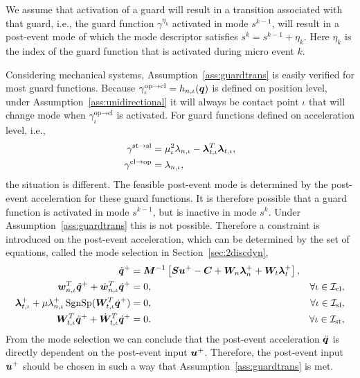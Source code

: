 \documentclass[../DC2017114Bouma.tex]{subfiles}
\begin{document}
\begin{sloppypar}
\begin{myass}\label{ass:guardtrans}
We assume that activation of a guard will result in a transition associated with that guard, i.e., the guard function $\gamma^{\eta_k}$ activated in mode $s^{k-1}$, will result in a post-event mode of which the mode descriptor satisfies $s^{k} = s^{k-1} + \eta_k$. Here $\eta_k$ is the index of the guard function that is activated during micro event $k$.
\end{myass}
\end{sloppypar}

\begin{sloppypar}
\begin{myremark}
Considering mechanical systems, Assumption~\ref{ass:guardtrans} is easily verified for most guard functions. Because $\gamma^{\text{op}\rightarrow\text{cl}}_{\iota} = h_{n,\iota}({\boldsymbol{q}})$ is defined on position level, under Assumption~\ref{ass:unidirectional} it will always be contact point $\iota$ that will change mode when $\gamma^{\text{op}\rightarrow\text{cl}}_{\iota}$ is activated. For guard functions defined on acceleration level, i.e.,
\begin{align*}
\gamma^{\textnormal{st}\rightarrow\textnormal{sl}} &= \mu_\iota^2\lambda_{n,\iota} - \boldsymbol{\lambda}^T_{t,\iota}\boldsymbol{\lambda}_{t,\iota},\\
\gamma^{\textnormal{cl}\rightarrow\textnormal{op}} &= \lambda_{n,\iota},
\end{align*}
the situation is different. The feasible post-event mode is determined by the post-event acceleration for these guard functions. It is therefore possible that a guard function is activated in mode $s^{k-1}$, but is inactive in mode $s^{k}$. Under Assumption~\ref{ass:guardtrans} this is not possible. Therefore a constraint is introduced on the post-event acceleration, which can be determined by the set of equations, called the mode selection in Section~\ref{sec:2discdyn},
\begin{align}
\ddot{{\boldsymbol{q}}}^+ &= {\boldsymbol{M}}^{-1}\left[{\boldsymbol{S}}{\boldsymbol{u}}^+ - {\boldsymbol{C}} + {\boldsymbol{W}}_{n}\boldsymbol{\lambda}^+_{n} + {\boldsymbol{W}}_{t}\boldsymbol{\lambda}^+_{t}\right], &  \nonumber\\
{\boldsymbol{w}}^T_{n,\iota}\ddot{{\boldsymbol{q}}}^+ + \dot{{\boldsymbol{w}}}^T_{n,\iota}\dot{{\boldsymbol{q}}}^+ &= 0, & \forall \iota\in\mathcal{I}_{\text{cl}},\nonumber\\
\boldsymbol{\lambda}^+_{t,\iota} + \mu\lambda^+_{n,\iota}\operatorname{\text{SgnSp}}({\boldsymbol{W}}_{t,\iota}^T\dot{{\boldsymbol{q}}}^+) &= 0, & \forall \iota\in\mathcal{I}_{\text{sl}},\nonumber\\
{\boldsymbol{W}}^T_{t,\iota}\ddot{{\boldsymbol{q}}}^+ + \dot{{\boldsymbol{W}}}^T_{t,\iota}\dot{{\boldsymbol{q}}}^+ &= 0. & \forall \iota\in\mathcal{I}_{\text{st}},\nonumber
\end{align}
From the mode selection we can conclude that the post-event acceleration $\ddot{{\boldsymbol{q}}}$ is directly dependent on the post-event input ${\boldsymbol{u}}^+$. Therefore, the post-event input ${\boldsymbol{u}}^+$ should be chosen in such a way that Assumption~\ref{ass:guardtrans} is met.
\end{myremark}
\end{sloppypar}
\end{document}
